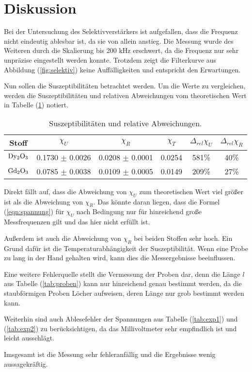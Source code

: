 \newpage
\section{Diskussion}
\label{sec:Diskussion}
\noindent
Bei der Untersuchung des Selektivverstärkers ist aufgefallen, 
dass die Frequenz nicht eindeutig ablesbar ist, da sie von allein anstieg.
Die Messung wurde des Weiteren durch die Skalierung bis 200 kHz erschwert, da die Frequenz nur sehr unpräzise eingestellt werden konnte.
Trotzdem zeigt die Filterkurve aus Abbildung (\ref{fig:selektiv}) keine Auffälligkeiten und entspricht den Erwartungen.


\noindent
Nun sollen die Suszeptibilitäten betrachtet werden.
Um die Werte zu vergleichen, werden die Suszeptibilitäten und relativen Abweichungen vom theoretischen Wert in Tabelle (\ref{tab:disk}) notiert.

\begin{table}
    \centering
    \begin{tabular}{c c c c c c}
        \toprule
        {Stoff} & {$\chi_U $} & {$\chi_R $} & {$\chi_T$} & {$\Delta_{rel}\chi_U$} & {$\Delta_{rel}\chi_R$} \\
    \midrule
    $\ce{Dy2O3}$ & 0.1730 $\pm$ 0.0026  & 0.0208 $\pm$ 0.0001 & 0.0254 & 581\% & 40\% \\
    $\ce{Gd2O3}$ & 0.0785 $\pm$ 0.0038  & 0.0109 $\pm$ 0.0005 & 0.0149 & 209\% & 27\% \\
    \bottomrule
\end{tabular}
\caption{Suszeptibilitäten und relative Abweichungen.}
\label{tab:disk}
\end{table}

\noindent
Direkt fällt auf, dass die Abweichung von $\chi_U$ zum theoretischen Wert viel größer ist als die Abweichung von $\chi_R$.
Das könnte daran liegen, dass die Formel (\ref{eqn:spannung})
für $\chi_U$ nach Bedingung nur für hinreichend große Messfrequenzen gilt und das hier nicht erfüllt ist.

\noindent
Außerdem ist auch die Abweichung von $\chi_R$ bei beiden Stoffen sehr hoch.
Ein Grund dafür ist die Temperaturabhängigkeit der Suszeptibilität.
Wenn eine Probe zu lang in der Hand gehalten wird, kann dies die Messergebnisse beeinflussen.

\noindent
Eine weitere Fehlerquelle stellt die Vermessung der Proben dar, denn die Länge $l$ aus Tabelle (\ref{tab:proben}) kann nur
hinreichend genau bestimmt werden, da die staubförmigen Proben Löcher aufweisen, deren Länge nur grob bestimmt werden kann.

\noindent
Weiterhin sind auch Ablesefehler der Spannungen aus Tabelle (\ref{tab:exp1}) und (\ref{tab:exp2}) zu berücksichtigen, da das Millivoltmeter sehr empfindlich ist und leicht ausschlägt.

\noindent
Imsgesamt ist die Messung sehr fehleranfällig und die Ergebnisse wenig aussagekräftig.


